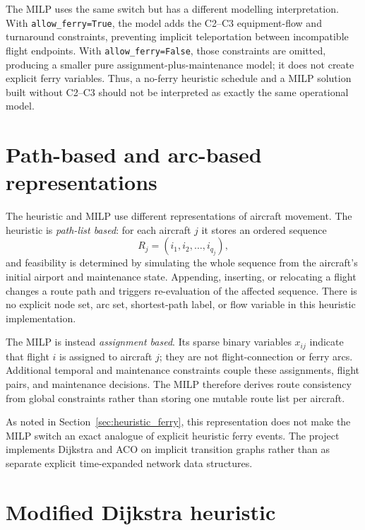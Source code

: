 The MILP uses the same switch but has a different modelling interpretation. With \texttt{allow\_ferry=True}, the model adds the C2--C3 equipment-flow and turnaround constraints, preventing implicit teleportation between incompatible flight endpoints. With \texttt{allow\_ferry=False}, those constraints are omitted, producing a smaller pure assignment-plus-maintenance model; it does not create explicit ferry variables. Thus, a no-ferry heuristic schedule and a MILP solution built without C2--C3 should not be interpreted as exactly the same operational model.

\section{Path-based and arc-based representations}
\label{sec:heuristic_path_arc}

The heuristic and MILP use different representations of aircraft movement. The heuristic is \emph{path-list based}: for each aircraft $j$ it stores an ordered sequence
\begin{equation}
    R_j=(i_1,i_2,\ldots,i_{q_j}),
\end{equation}
and feasibility is determined by simulating the whole sequence from the aircraft’s initial airport and maintenance state. Appending, inserting, or relocating a flight changes a route path and triggers re-evaluation of the affected sequence. There is no explicit node set, arc set, shortest-path label, or flow variable in this heuristic implementation.

The MILP is instead \emph{assignment based}. Its sparse binary variables
$x_{ij}$ indicate that flight $i$ is assigned to aircraft $j$; they are not
flight-connection or ferry arcs. Additional temporal and maintenance
constraints couple these assignments, flight pairs, and maintenance decisions.
The MILP therefore derives route consistency from global constraints rather
than storing one mutable route list per aircraft.

As noted in Section~\ref{sec:heuristic_ferry}, this representation does not
make the MILP switch an exact analogue of explicit heuristic ferry events. The
project implements Dijkstra and ACO on implicit transition graphs rather than
as separate explicit time-expanded network data structures.

\section{Modified Dijkstra heuristic}
\label{sec:heuristic_network}

